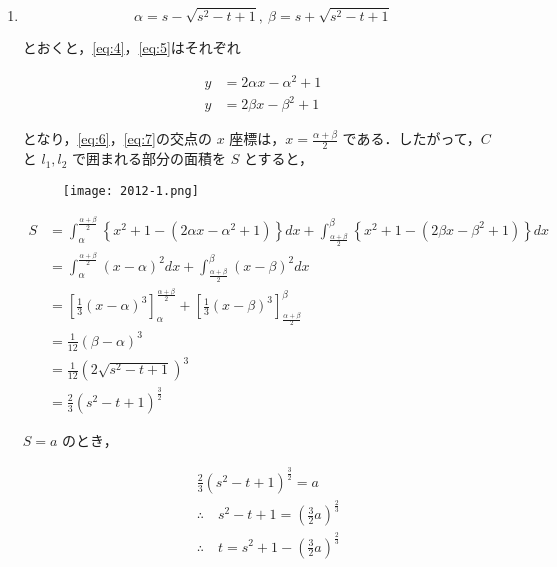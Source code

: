 \documentclass[a4paper]{ltjsarticle}
\begin{document}
\begin{enumerate}[label=(\arabic*)]
    \item
          \begin{equation*}
              \alpha=s-\sqrt{s^2-t+1},\ \beta=s+\sqrt{s^2-t+1}
          \end{equation*}

          とおくと，\eqref{eq:4}，\eqref{eq:5}はそれぞれ

          \begin{align}
              y & =2\alpha x-\alpha^2+1\label{eq:6} \\
              y & =2\beta x-\beta^2+1\label{eq:7}
          \end{align}

          となり，\eqref{eq:6}，\eqref{eq:7}の交点の $x$ 座標は，$x=\frac{\alpha+\beta}{2}$ である．したがって，$C$ と $l_1, l_2$ で囲まれる部分の面積を $S$ とすると，

          \begin{figure}[!ht]
              \centering
              \texttt{[image: 2012-1.png]}
          \end{figure}

          \begin{align*}
              S & =\int_\alpha^{\frac{\alpha+\beta}{2}}\left\{x^2+1-(2\alpha x-\alpha^2+1)\right\}dx+\int_{\frac{\alpha+\beta}{2}}^\beta\left\{x^2+1-(2\beta x-\beta^2+1)\right\}dx \\
                & =\int_\alpha^{\frac{\alpha+\beta}{2}}(x-\alpha)^2dx+\int_{\frac{\alpha+\beta}{2}}^\beta(x-\beta)^2dx                                                              \\
                & =\left[\frac{1}{3}(x-\alpha)^3\right]_\alpha^{\frac{\alpha+\beta}{2}}+\left[\frac{1}{3}(x-\beta)^3\right]_{\frac{\alpha+\beta}{2}}^\beta                          \\
                & =\frac{1}{12}(\beta-\alpha)^3                                                                                                                                     \\
                & =\frac{1}{12}(2\sqrt{s^2-t+1})^3                                                                                                                                  \\
                & =\frac{2}{3}(s^2-t+1)^{\frac{3}{2}}
          \end{align*}

          $S=a$ のとき，

          \begin{align*}
               & \frac{2}{3}(s^2-t+1)^{\frac{3}{2}}=a                            \\
               & \therefore\quad s^2-t+1=\left(\frac{3}{2}a\right)^{\frac{2}{3}} \\
               & \therefore\quad t=s^2+1-\left(\frac{3}{2}a\right)^{\frac{2}{3}}
          \end{align*}


\end{enumerate}
\end{document}

